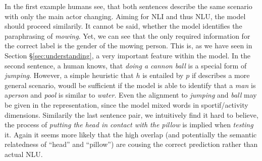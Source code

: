 In the first example humans see, that both sentences describe the same scenario with only the main actor changing. Aiming for \ac{NLI} and thus \ac{NLU}, the model should proceed similarily. It cannot be said, whether the model identifies the paraphrasing of \textit{mowing}. Yet, we can see that the only required information for the correct label is the gender of the mowing person. This is, as we have seen in Section §\ref{sec:understanding}, a very important feature within the model. In the second sentence, a human knows, that \textit{doing a cannon ball} is a special form of \textit{jumping}. However, a simple heuristic that $h$ is entailed by $p$ if describes a more general scenario, woudl be sufficient if the model is able to identify that a \textit{man} is a\textit{person} and \textit{pool} is similar to \textit{water}. Even the alignment to \textit{jumping} and \textit{ball} may be given in the representation, since the model mixed words in sportif/activity dimensions. Similarily the last sentence pair, we intuitively find it hard to believe, the process of \textit{putting the head in contact with the pillow} is implied when \textit{testing} it. Again it seems more likely that the high overlap (and potentially the semantic relatedness of ``head'' and ``pillow'') are cousing the correct prediction rather than actual \ac{NLU}. 


